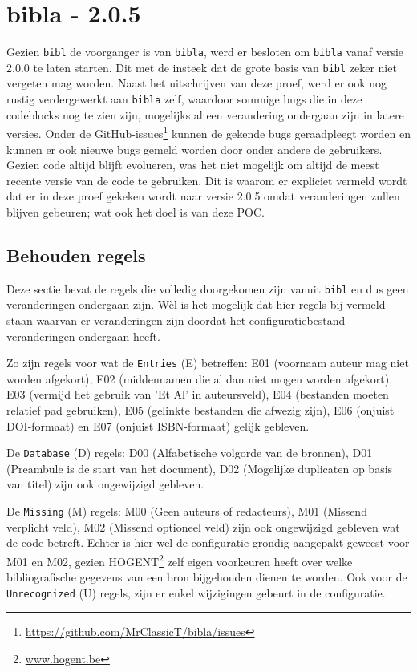 \section{bibla - 2.0.5}
Gezien \texttt{bibl} de voorganger is van \texttt{bibla}, werd er besloten om \texttt{bibla} vanaf versie 2.0.0 te laten starten. Dit met de insteek dat de grote basis van \texttt{bibl} zeker niet vergeten mag worden. Naast het uitschrijven van deze proef, werd er ook nog rustig verdergewerkt aan \texttt{bibla} zelf, waardoor sommige bugs die in deze codeblocks nog te zien zijn, mogelijks al een verandering ondergaan zijn in latere versies. Onder de GitHub-issues\footnote{\url{https://github.com/MrClassicT/bibla/issues}} kunnen de gekende bugs geraadpleegt worden en kunnen er ook nieuwe bugs gemeld worden door onder andere de gebruikers. Gezien code altijd blijft evolueren, was het niet mogelijk om altijd de meest recente versie van de code te gebruiken. Dit is waarom er expliciet vermeld wordt dat er in deze proef gekeken wordt naar versie 2.0.5 omdat veranderingen zullen blijven gebeuren; wat ook het doel is van deze \acrshort{POC}.

\subsection{Behouden regels}
Deze sectie bevat de regels die volledig doorgekomen zijn vanuit \texttt{bibl} en dus geen veranderingen ondergaan zijn. Wèl is het mogelijk dat hier regels bij vermeld staan waarvan er veranderingen zijn doordat het configuratiebestand veranderingen ondergaan heeft.

Zo zijn regels voor wat de \texttt{Entries} (E) betreffen: E01 (voornaam auteur mag niet worden afgekort), E02 (middennamen die al dan niet mogen worden afgekort), E03 (vermijd het gebruik van 'Et Al' in auteursveld), E04 (bestanden moeten relatief pad gebruiken), E05 (gelinkte bestanden die afwezig zijn), E06 (onjuist DOI-formaat) en E07 (onjuist ISBN-formaat) gelijk gebleven. 

De \texttt{Database} (D) regels: D00 (Alfabetische volgorde van de bronnen), D01 (Preambule is de start van het document), D02 (Mogelijke duplicaten op basis van titel) zijn ook ongewijzigd gebleven.

De \texttt{Missing} (M) regels: M00 (Geen auteurs of redacteurs), M01 (Missend verplicht veld), M02 (Missend optioneel veld) zijn ook ongewijzigd gebleven wat de code betreft. Echter is hier wel de configuratie grondig aangepakt geweest voor M01 en M02, gezien HOGENT\footnote{\url{www.hogent.be}} zelf eigen voorkeuren heeft over welke bibliografische gegevens van een bron bijgehouden dienen te worden. Ook voor de \texttt{Unrecognized} (U) regels, zijn er enkel wijzigingen gebeurt in de configuratie. 

